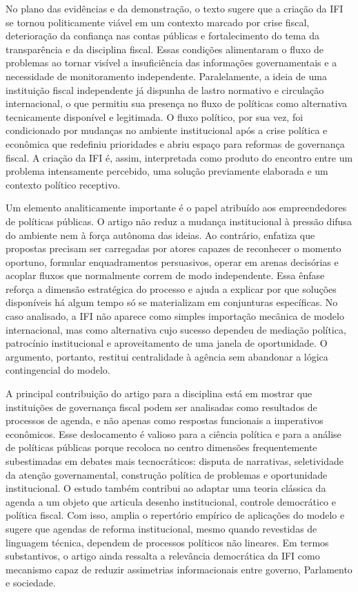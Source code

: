 \documentclass[12pt,a4paper]{article}
\begin{document}
No plano das evidências e da demonstração, o texto sugere que a criação da IFI se tornou politicamente viável em um contexto marcado por crise fiscal, deterioração da confiança nas contas públicas e fortalecimento do tema da transparência e da disciplina fiscal. Essas condições alimentaram o fluxo de problemas ao tornar visível a insuficiência das informações governamentais e a necessidade de monitoramento independente. Paralelamente, a ideia de uma instituição fiscal independente já dispunha de lastro normativo e circulação internacional, o que permitiu sua presença no fluxo de políticas como alternativa tecnicamente disponível e legitimada. O fluxo político, por sua vez, foi condicionado por mudanças no ambiente institucional após a crise política e econômica que redefiniu prioridades e abriu espaço para reformas de governança fiscal. A criação da IFI é, assim, interpretada como produto do encontro entre um problema intensamente percebido, uma solução previamente elaborada e um contexto político receptivo.\parencite{anonsd_sem_titulo}

Um elemento analiticamente importante é o papel atribuído aos empreendedores de políticas públicas. O artigo não reduz a mudança institucional à pressão difusa do ambiente nem à força autônoma das ideias. Ao contrário, enfatiza que propostas precisam ser carregadas por atores capazes de reconhecer o momento oportuno, formular enquadramentos persuasivos, operar em arenas decisórias e acoplar fluxos que normalmente correm de modo independente. Essa ênfase reforça a dimensão estratégica do processo e ajuda a explicar por que soluções disponíveis há algum tempo só se materializam em conjunturas específicas. No caso analisado, a IFI não aparece como simples importação mecânica de modelo internacional, mas como alternativa cujo sucesso dependeu de mediação política, patrocínio institucional e aproveitamento de uma janela de oportunidade. O argumento, portanto, restitui centralidade à agência sem abandonar a lógica contingencial do modelo.\parencite{anonsd_sem_titulo,brasil2022_abordagens_contemporaneas}

A principal contribuição do artigo para a disciplina está em mostrar que instituições de governança fiscal podem ser analisadas como resultados de processos de agenda, e não apenas como respostas funcionais a imperativos econômicos. Esse deslocamento é valioso para a ciência política e para a análise de políticas públicas porque recoloca no centro dimensões frequentemente subestimadas em debates mais tecnocráticos: disputa de narrativas, seletividade da atenção governamental, construção política de problemas e oportunidade institucional. O estudo também contribui ao adaptar uma teoria clássica da agenda a um objeto que articula desenho institucional, controle democrático e política fiscal. Com isso, amplia o repertório empírico de aplicações do modelo e sugere que agendas de reforma institucional, mesmo quando revestidas de linguagem técnica, dependem de processos políticos não lineares. Em termos substantivos, o artigo ainda ressalta a relevância democrática da IFI como mecanismo capaz de reduzir assimetrias informacionais entre governo, Parlamento e sociedade.\parencite{anonsd_sem_titulo}
\end{document}
